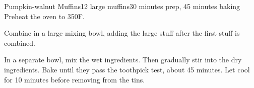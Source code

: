 \documentclass[../Cookbook.tex]{subfiles}
\begin{document}
\begin{recipe}{Pumpkin-walnut Muffins}{12 large muffins}{30 minutes prep, 45 minutes baking}
Preheat the oven to 350\0F.

Combine in a large mixing bowl, adding the large stuff after the first stuff is combined.

In a separate bowl, mix the wet ingredients.
Then gradually stir into the dry ingredients. Bake until they pass the toothpick test, about 45 minutes. Let cool for 10 minutes before removing from the tins.


\end{recipe}
\end{document}

